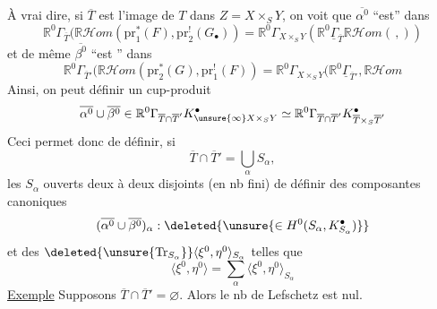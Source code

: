 À vrai dire,  si $\overline{T}$ est l'image de $T$ dans $Z=X\times_S Y$, on voit que $\overline{\alpha^0}$ ``est'' dans 
\[
\mathbb{R}^0\Gamma_{\overline{T}}(\mathbb{R}\mathcal{H}om(\mathrm{pr}_1^*(F),\mathrm{pr}_2^!(G_\bullet))
=\mathbb{R}^0\Gamma_{X\times_S Y}(\mathbb{R}^0\underline{\Gamma}_{\overline{T}}\mathbb{R}\mathcal{H}om(\,,))
\]
et de même $\overline{\beta^0}$ ``est '' dans
\[
\mathbb{R}^0\Gamma_{\overline{T}'}(\mathbb{R}\mathcal{H}om(\mathrm{pr}_2^*(G),\mathrm{pr}_1^!(F))
=\mathbb{R}^0\Gamma_{X\times_S Y}(\mathbb{R}^0\underline{\Gamma}_{\overline{T}'},\mathbb{R}\mathcal{H}om
\]
Ainsi, on peut définir un cup-produit
\[
\overline{\alpha^0}\cup\overline{\beta^0}\in
\mathbb{R}^0\Gamma_{\overline{T}\cap\overline{T}'}K_{\unsure{\infty}X\times_S Y}^{\bullet}
\simeq\mathbb{R}^0\Gamma_{\overline{T}\cap\overline{T}'}K_{\overline{T}\times_S\overline{T}'}^{\bullet}
\]
Ceci permet donc de définir, si
\[
\overline{T}\cap\overline{T}'=\bigcup_\alpha S_\alpha,
\]
 les $S_\alpha$ ouverts deux à deux disjoints (en nb fini) de définir des composantes canoniques
\[
(\overline{\alpha^0}\cup\overline{\beta^0})_\alpha:
\deleted{\unsure{\in H^0(S_\alpha,K_{S_\alpha}^{\bullet})}}
\]
et des $\deleted{\unsure{\operatorname{Tr}_{S_\alpha}}}\langle\xi^0,\eta^0\rangle_{S_\alpha}$ telles que
\[
\langle\xi^0,\eta^0\rangle=\sum_\alpha\langle\xi^0,\eta^0\rangle_{S_\alpha}
\]
\uline{Exemple} Supposons $\overline{T}\cap\overline{T}'=\varnothing$. Alors le nb de Lefschetz est nul.
